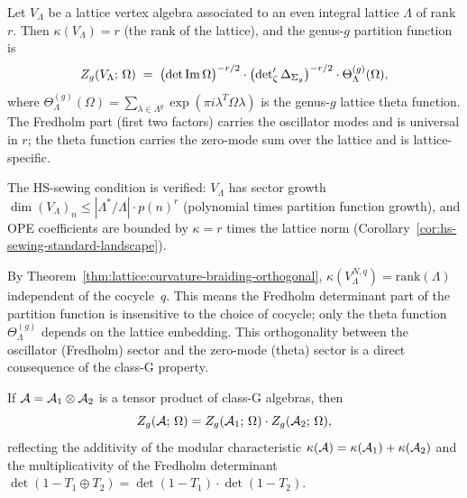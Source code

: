 \begin{example}%
\label{ex:thqg-X-lattice-fredholm}%
%
Let $V_\Lambda$ be a lattice vertex algebra associated to an
even integral lattice $\Lambda$ of rank $r$. Then
$\kappa(V_\Lambda) = r$ (the rank of the lattice), and the
genus-$g$ partition function is
\begin{equation}\label{eq:thqg-X-lattice-formula}
Z_g(V_\Lambda;\,\Omega)
\;=\;
\bigl(\det\operatorname{Im}\Omega\bigr)^{-r/2}
\cdot
\bigl(\det\nolimits'_\zeta\Delta_{\Sigma_g}\bigr)^{-r/2}
\cdot
\Theta_\Lambda^{(g)}(\Omega),
\end{equation}
where $\Theta_\Lambda^{(g)}(\Omega)
= \sum_{\lambda \in \Lambda^g}
\exp(\pi i \lambda^T \Omega \lambda)$ is the genus-$g$
lattice theta function. The Fredholm part (first two factors)
carries the oscillator modes and is universal in $r$;
the theta function carries the zero-mode sum over the
lattice and is lattice-specific.

The HS-sewing condition is verified: $V_\Lambda$ has sector
growth $\dim (V_\Lambda)_n \leq |\Lambda^*/\Lambda| \cdot p(n)^r$
(polynomial times partition function growth), and OPE
coefficients are bounded by $\kappa = r$ times the lattice
norm (Corollary~\ref{cor:hs-sewing-standard-landscape}).
\end{example}

\begin{remark}%
\label{rem:thqg-X-lattice-curvature-braiding}%
%
By Theorem~\ref{thm:lattice:curvature-braiding-orthogonal},
$\kappa(V_\Lambda^{N,q}) = \mathrm{rank}(\Lambda)$
independent of the cocycle~$q$. This means the Fredholm
determinant part of the partition function is insensitive to
the choice of cocycle; only the theta function
$\Theta_\Lambda^{(g)}$ depends on the lattice embedding.
This orthogonality between the oscillator (Fredholm) sector
and the zero-mode (theta) sector is a direct consequence of
the class-G property.
\end{remark}

\begin{proposition}%
\label{prop:thqg-X-rank-additivity}%
%
If $\mathcal{A} = \mathcal{A}_1 \otimes \mathcal{A}_2$ is a tensor product of
class-G algebras, then
\begin{equation}\label{eq:thqg-X-rank-additivity}
Z_g(\mathcal{A};\,\Omega)
= Z_g(\mathcal{A}_1;\,\Omega)
\cdot Z_g(\mathcal{A}_2;\,\Omega),
\end{equation}
reflecting the additivity of the modular characteristic
$\kappa(\mathcal{A}) = \kappa(\mathcal{A}_1) + \kappa(\mathcal{A}_2)$
and the multiplicativity of the Fredholm determinant
$\det(1 - T_1 \oplus T_2)
= \det(1 - T_1) \cdot \det(1 - T_2)$.
\end{proposition}

